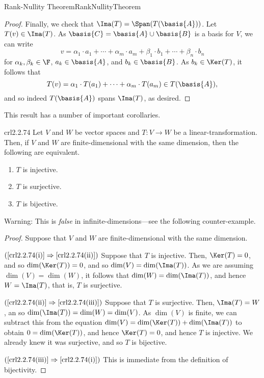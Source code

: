 \begin{thm}{Rank-Nullity Theorem}{RankNullityTheorem}
\begin{proof}
		Finally, we check that $\Ima (T)=\Span (T(\basis{A}))$.  Let $T(v)\in \Ima (T)$.  As $\basis{C}=\basis{A}\cup \basis{B}$ is a basis for $V$, we can write
		\begin{equation}
			v=\alpha _1\cdot a_1+\cdots +\alpha _m\cdot a_m+\beta _1\cdot b_1+\cdots +\beta _n\cdot b_n
		\end{equation}
		for $\alpha _k,\beta _k\in \F$, $a_k\in \basis{A}$, and $b_k\in \basis{B}$.  As $b_k\in \Ker (T)$, it follows that
		\begin{equation}
			T(v)=\alpha _1\cdot T(a_1)+\cdots +\alpha _m\cdot T(a_m)\in T(\basis{A}),
		\end{equation}
		and so indeed $T(\basis{A})$ spans $\Ima (T)$, as desired.
	\end{proof}
\end{thm}
This result has a number of important corollaries.
\begin{crl}{}{crl2.2.74}
	Let $V$ and $W$ be vector spaces and $T\colon V\rightarrow W$ be a linear-transformation.  Then, if $V$ and $W$ are finite-dimensional with the same dimension, then the following are equivalent.
	\begin{enumerate}
		\item \label{crl2.2.74(i)}$T$ is injective.
		\item \label{crl2.2.74(ii)}$T$ is surjective.
		\item \label{crl2.2.74(iii)}$T$ is bijective.
	\end{enumerate}
	\begin{rmk}
		Warning:  This is \emph{false} in infinite-dimensions---see the following counter-example.
	\end{rmk}
	\begin{proof}
		Suppose that $V$ and $W$ are finite-dimensional with the same dimension.
		
		\blni
		$(\cref{crl2.2.74(i)}\Rightarrow \cref{crl2.2.74(ii)})$ Suppose that $T$ is injective.  Then, $\Ker (T)=0$, and so $\dim (\Ker (T))=0$, and so $\dim (V)=\dim (\Ima (T))$.  As we are assuming $\dim (V)=\dim (W)$, it follows that $\dim (W)=\dim (\Ima (T))$, and hence $W=\Ima (T)$, that is, $T$ is surjective.
		
		\blni
		$(\cref{crl2.2.74(ii)}\Rightarrow \cref{crl2.2.74(iii)})$ Suppose that $T$ is surjective.  Then, $\Ima (T)=W$, an so $\dim (\Ima (T))=\dim (W)=\dim (V)$.  As $\dim (V)$ is finite, we can subtract this from the equation $\dim (V)=\dim (\Ker (T))+\dim (\Ima (T))$ to obtain $0=\dim (\Ker (T))$, and hence $\Ker (T)=0$, and hence $T$ is injective.  We already knew it was surjective, and so $T$ is bijective.
		
		\blni
		$(\cref{crl2.2.74(iii)}\Rightarrow \cref{crl2.2.74(i)})$ This is immediate from the definition of bijectivity.
	\end{proof}
\end{crl}

